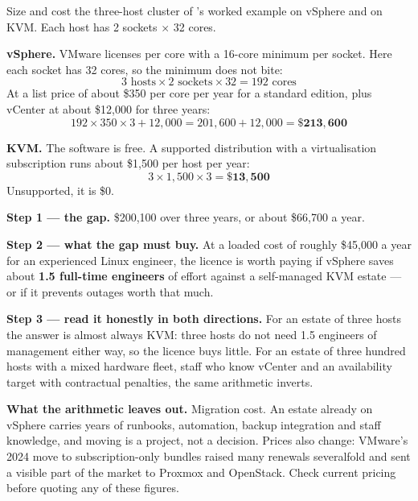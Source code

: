 \begin{worked}
Size and cost the three-host cluster of 's worked example on vSphere
and on KVM. Each host has 2 sockets $\times$ 32 cores.

\smallskip
\textbf{vSphere.} VMware licenses per core with a 16-core minimum per socket.
Here each socket has 32 cores, so the minimum does not bite:
\[ 3 \text{ hosts} \times 2 \text{ sockets} \times 32 = 192 \text{ cores} \]
At a list price of about \$350 per core per year for a standard edition, plus
vCenter at about \$12{,}000 for three years:
\[ 192 \times 350 \times 3 + 12{,}000 = 201{,}600 + 12{,}000
   = \mathbf{\$213{,}600} \]

\smallskip
\textbf{KVM.} The software is free. A supported distribution with a virtualisation
subscription runs about \$1{,}500 per host per year:
\[ 3 \times 1{,}500 \times 3 = \mathbf{\$13{,}500} \]
Unsupported, it is \$0.

\smallskip
\textbf{Step 1 --- the gap.} \$200{,}100 over three years, or about
\$66{,}700 a year.

\smallskip
\textbf{Step 2 --- what the gap must buy.} At a loaded cost of roughly
\$45{,}000 a year for an experienced Linux engineer, the licence is worth
paying if vSphere saves about \textbf{1.5 full-time engineers} of effort
against a self-managed KVM estate --- or if it prevents outages worth that
much.

\smallskip
\textbf{Step 3 --- read it honestly in both directions.} For an estate of three
hosts the answer is almost always KVM: three hosts do not need 1.5 engineers
of management either way, so the licence buys little. For an estate of three
hundred hosts with a mixed hardware fleet, staff who know vCenter and an
availability target with contractual penalties, the same arithmetic inverts.

\smallskip
\textbf{What the arithmetic leaves out.} Migration cost. An estate already on
vSphere carries years of runbooks, automation, backup integration and staff
knowledge, and moving is a project, not a decision. Prices also change: VMware's
2024 move to subscription-only bundles raised many renewals severalfold and
sent a visible part of the market to Proxmox and OpenStack. Check current
pricing before quoting any of these figures.
\end{worked}


